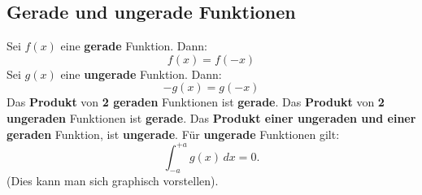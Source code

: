 \documentclass[landscape, 10pt]{article}
\begin{document}
\begin{multicols}{3}
       \subsection{Gerade und ungerade Funktionen}
              Sei \textcolor{NavyBlue}{$f(x)$}
              eine \textbf{gerade} Funktion. 
              Dann: 
              \begin{equation*}
                     f(x)=f(-x)
              \end{equation*}
              Sei \textcolor{NavyBlue}{$g(x)$} eine 
              \textbf{ungerade} 
              Funktion. Dann:
              \begin{equation*}
                     -g(x)=g(-x)
              \end{equation*}
              Das \textbf{Produkt} von \textbf{2 geraden} 
              Funktionen 
              ist \textbf{gerade}. Das \textbf{Produkt} 
              von \textbf{2 ungeraden}
              Funktionen ist \textbf{gerade}. 
              Das \textbf{Produkt einer 
              ungeraden und einer geraden} Funktion,
              ist \textbf{ungerade}.
              Für \textbf{ungerade} Funktionen gilt:
              \begin{equation*}
                     \int_{-a}^{+a}g(x)\,dx=0.
              \end{equation*}
              (Dies kann man sich graphisch vorstellen).

\end{multicols}
\end{document}
